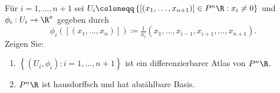 \begin{assignment}
  Für \( i = 1,\dots,n+1 \) sei \( U_i \coloneqq \left \{ [\left( x_1,\dots,x_{n+1} \right)] \in P^n\R : x_i \neq 0 \right \} \) und \( \phi_i : U_i \to \R^n \) gegeben durch
  \begin{equation*}
    \phi_i\left( [(x_1,\dots,x_n)] \right) \coloneqq \tfrac{1}{x_i}(x_1,\dots,x_{i-1},x_{i+1},\dots,x_{n+1})\text{.}
  \end{equation*}
  Zeigen Sie:
  \begin{enumerate}[label= (\alph*)]
    \item \( \left \{ (U_i,\phi_i) : i = 1,\dots,n+1 \right \} \) ist ein differenzierbarer Atlas von \( P^n\R \).
    \item \( P^n\R \) ist hausdorffsch und hat abzählbare Basis.
  \end{enumerate}
\end{assignment}
